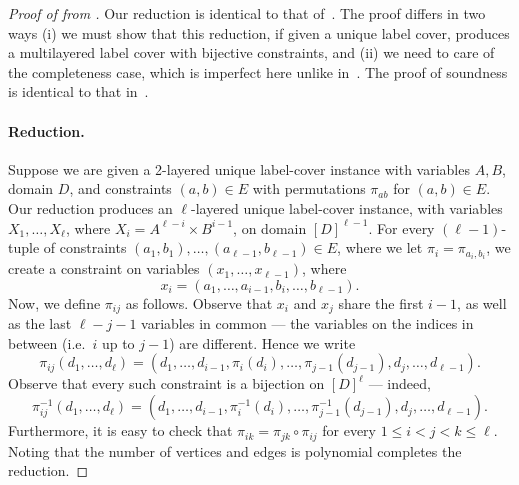 \documentclass[a4paper,11pt, DIV=11]{scrartcl}
\theoremstyle{plain}
\theoremstyle{definition}
\begin{document}
\begin{proof}[{Proof of  from }]
Our reduction is identical to that of~\cite{BWZ21}. The proof differs in two
  ways (i) we must show that this reduction, if given a unique label cover,
  produces a multilayered label cover with bijective constraints, and (ii) we
  need to care of the completeness case, which is imperfect here unlike
  in~\cite{BWZ21}. The proof of soundness is identical to that in~\cite{BWZ21}.

\paragraph{Reduction.} Suppose we are given a 2-layered unique label-cover instance with variables $A, B$, domain $D$, and constraints $(a, b) \in E$ with permutations $\pi_{ab}$ for $(a, b) \in E$. Our reduction produces an $\ell$-layered unique label-cover instance, with variables $X_1, \ldots, X_\ell$, where $X_i = A^{\ell - i}\times B^{i - 1}$, on domain $[D]^{\ell - 1}$. For every $(\ell - 1)$-tuple of constraints $(a_1, b_1), \ldots, (a_{\ell -1 }, b_{\ell -1 }) \in E$, where we let $\pi_i =  \pi_{a_i, b_i}$, we create a constraint on variables $(x_1, \ldots, x_{\ell - 1})$, where
\[
x_i = (a_1, \ldots, a_{i - 1}, b_{i}, \ldots, b_{\ell - 1}).
\]
Now, we define $\pi_{ij}$ as follows. Observe that $x_i$ and $x_j$ share the first $i - 1$, as well as the last $\ell - j - 1$ variables in common --- the variables on the indices in between (i.e.~$i$ up to $j - 1$) are different. Hence we write
\[
\pi_{ij}(d_1, \ldots, d_\ell)
=
(d_1, \ldots, d_{i - 1}, \pi_{i}(d_{i}), \ldots, \pi_{j - 1}(d_{j - 1}), d_{j}, \ldots, d_{\ell - 1}).
\]
Observe that every such constraint is a bijection on $[D]^{\ell}$ --- indeed,
\[
\pi_{ij}^{-1}(d_1, \ldots, d_\ell)
=
(d_1, \ldots, d_{i - 1}, \pi_{i}^{-1}(d_{i}), \ldots, \pi_{j - 1}^{-1}(d_{j - 1}), d_{j}, \ldots, d_{\ell - 1}).
\]
Furthermore, it is easy to check that $\pi_{ik} = \pi_{jk} \circ \pi_{ij}$ for every $1 \leq i < j < k \leq \ell$. Noting that the number of vertices and edges is polynomial completes the reduction.


\end{proof}
\end{document}
